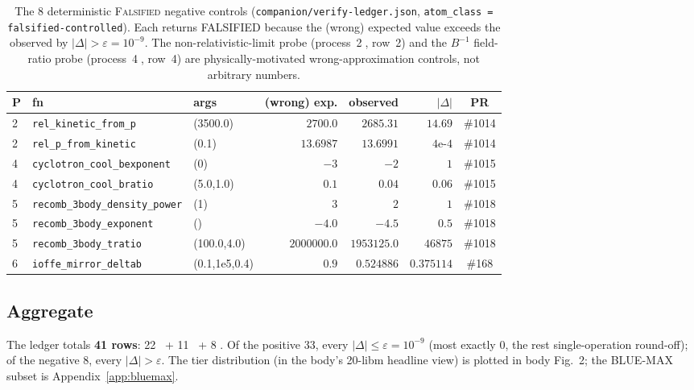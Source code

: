 \begin{table}[h]
\centering
\footnotesize
\setlength{\tabcolsep}{4pt}
\begin{tabular}{@{}c l l r r r c@{}}
\toprule
\textbf{P} & \textbf{fn} & \textbf{args} & \textbf{(wrong) exp.} & \textbf{observed} & $|\Delta|$ & \textbf{PR} \\
\midrule
\textcircled{\scriptsize 2} & \verb|rel_kinetic_from_p|     & (3500.0)    & $2700.0$    & $2685.31$   & $14.69$     & \#1014 \\
\textcircled{\scriptsize 2} & \verb|rel_p_from_kinetic|     & (0.1)       & $13.6987$   & $13.6991$   & $4$e$\text{-}4$ & \#1014 \\
\textcircled{\scriptsize 4} & \verb|cyclotron_cool_bexponent| & (0)       & $-3$        & $-2$        & $1$         & \#1015 \\
\textcircled{\scriptsize 4} & \verb|cyclotron_cool_bratio|  & (5.0,1.0)   & $0.1$       & $0.04$      & $0.06$      & \#1015 \\
\textcircled{\scriptsize 5} & \verb|recomb_3body_density_power| & (1)     & $3$         & $2$         & $1$         & \#1018 \\
\textcircled{\scriptsize 5} & \verb|recomb_3body_exponent|  & ()          & $-4.0$      & $-4.5$      & $0.5$       & \#1018 \\
\textcircled{\scriptsize 5} & \verb|recomb_3body_tratio|    & (100.0,4.0) & $2000000.0$ & $1953125.0$ & $46875$     & \#1018 \\
\textcircled{\scriptsize 6} & \verb|ioffe_mirror_deltab|    & (0.1,1e5,0.4) & $0.9$     & $0.524886$  & $0.375114$  & \#168 \\
\bottomrule
\end{tabular}
\caption{The 8 deterministic \textsc{Falsified} negative controls
(\texttt{companion/verify-ledger.json}, \texttt{atom\_class =
falsified-controlled}). Each returns FALSIFIED because the (wrong) expected
value exceeds the observed by $|\Delta|>\varepsilon=10^{-9}$. The
non-relativistic-limit probe (process~\textcircled{\scriptsize 2}, row~2) and
the $B^{-1}$ field-ratio probe (process~\textcircled{\scriptsize 4}, row~4)
are physically-motivated wrong-approximation controls, not arbitrary numbers.}
\label{tab:vl-controls}
\end{table}

\subsection{Aggregate}
\label{app:vl-aggregate}

The ledger totals \textbf{41 rows}: 22 \tierGreen\ + 11 \tierBlue\ + 8
\tierRed. Of the positive 33, every $|\Delta|\le\varepsilon=10^{-9}$ (most
exactly $0$, the rest single-operation round-off); of the negative 8, every
$|\Delta|>\varepsilon$. The tier distribution (in the body's 20-libm headline
view) is plotted in body Fig.~2; the BLUE-MAX subset is Appendix~\ref{app:bluemax}.
